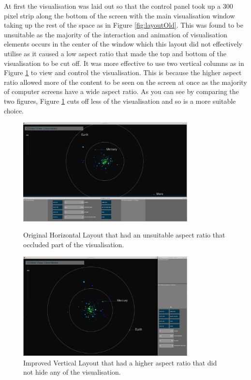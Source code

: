 At first the visualisation was laid out so that the control panel took up a
300 pixel strip along the bottom of the screen with the main visualisation
window
taking up the rest of the space as in Figure \ref{fig:layoutOld}.
 This was found to be unsuitable as the majority of the interaction and
animation of visualisation elements occurs
in the center of the window which this layout did not effectively utilise as it
caused a low aspect ratio that made the top and bottom of the visualisation to
be
cut off. It
was more effective to use two vertical columns as in Figure \ref{fig:layoutNew}
to view and control the visualisation. This is because
the higher aspect ratio allowed more of the content to be seen on the
screen at once as the majority of computer screens have a
wide aspect ratio. As you can see by comparing the two figures, Figure
\ref{fig:layoutNew} cuts off less of the visualisation and so is a more suitable
choice.

\begin{figure}[H]
  \centering
      \includegraphics[width=0.8\textwidth]{images/layout_horizontal.jpg}
  \caption[Original Horizontal Layout]{Original Horizontal Layout that had an
unsuitable aspect ratio that occluded part of the visualisation.}  
    \label{fig:layoutOld}
        \includegraphics[width=0.8\textwidth]{images/layout_vertical.jpg}
  \caption[Improved Vertical Layout]{Improved Vertical Layout that had a higher
aspect ratio that did not hide any of the visualisation.}
  \label{fig:layoutNew}
\end{figure}


